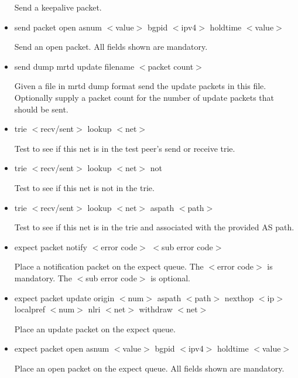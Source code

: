 \documentclass[11pt]{article}
\begin{document}
\begin{itemize}
  Send a keepalive packet.

\item {\sf send packet open
                        asnum $<$value$>$ 
                        bgpid $<$ipv4$>$ 
                        holdtime $<$value$>$}

  Send an open packet.  All fields shown are mandatory.

\item {\sf send dump mrtd update filename $<$packet count$>$}
  
  Given a file in mrtd dump format send the update packets in this
  file. Optionally supply a packet count for the number of update
  packets that should be sent.

\item {\sf trie $<$recv/sent$>$ lookup $<$net$>$}

  Test to see if this net is in the test peer's send or receive trie.

\item {\sf trie $<$recv/sent$>$ lookup $<$net$>$ not}

  Test to see if this net is not in the trie.

\item {\sf trie $<$recv/sent$>$ lookup $<$net$>$ aspath $<$path$>$}

  Test to see if this net is in the trie and associated with the
  provided AS path.

\item {\sf expect packet notify $<$error code$>$ $<$sub error code$>$}

  Place a notification packet on the expect queue. The $<$error code$>$ is
  mandatory. The $<$sub error code$>$ is optional.
  
\item {\sf expect packet update 
                    origin $<$num$>$ 
                    aspath $<$path$>$ 
                    nexthop $<$ip$>$ 
                    localpref $<$num$>$
                    nlri $<$net$>$
                    withdraw $<$net$>$}

  Place an update packet on the expect queue.

\item {\sf expect packet open 
                        asnum $<$value$>$ 
                        bgpid $<$ipv4$>$ 
                        holdtime $<$value$>$}

  Place an open packet on the expect queue. All fields shown are mandatory.


\end{itemize}
\end{document}
